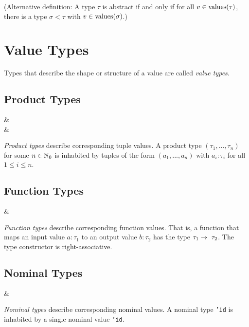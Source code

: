 (Alternative definition: A type $\tau$ is abstract if and only if for all $v \in \operatorname{values}(\tau)$, there is a type $\sigma < \tau$ with $v \in \operatorname{values}(\sigma)$.)



\section{Value Types}

Types that describe the shape or structure of a value are called \textit{value types}.


\subsection{Product Types}

\begin{grammar}
 &\produce {} \\
 &\produce {}
\end{grammar}

\noindent \textit{Product types} describe corresponding tuple values. A product type $(\tau_1, ..., \tau_n)$ for some $n \in \mathbb{N}_0$ is inhabited by tuples of the form $(a_1, ..., a_n)$ with $a_i : \tau_i$ for all $1 \leq i \leq n$.


\subsection{Function Types}

\begin{grammar}
 &\produce {}
\end{grammar}

\noindent \textit{Function types} describe corresponding function values. That is, a function that maps an input value $a : \tau_1$ to an output value $b : \tau_2$ has the type $\tau_1 \fto \tau_2$. The type constructor is right-associative.


\subsection{Nominal Types}

\begin{grammar}
 &\produce {}
\end{grammar}

\noindent \textit{Nominal types} describe corresponding nominal values. A nominal type \texttt{'id} is inhabited by a single nominal value \texttt{'id}.



